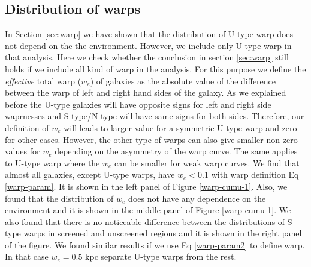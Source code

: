 \documentclass[twocolappendix, numberedappendix]{emulateapj}
\begin{document}
\subsection{Distribution of warps}
\label{ap:warp-distri}
In Section \ref{sec:warp} we have shown that the distribution of
U-type warp does not depend on the the environment. However, we include
only U-type warp in that analysis. Here we check whether the conclusion in
 section \ref{sec:warp} still holds if we include all kind of
warp in the analysis. For this purpose we define the \textit{effective}
total warp ($w_e$) of galaxies as the absolute value of the difference
between the warp of left and right hand sides of the galaxy. As we
explained before the U-type galaxies will have opposite signs for left and 
right side waprnesses and S-type/N-type will have same signs for both sides.
Therefore, our definition of $w_e$ will leads to larger value for a symmetric
U-type warp and zero for other cases. However, the other type of warps can also
give smaller non-zero values for $w_e$ depending on the asymmetry of the warp
curve. The same applies to U-type warp where the $w_e$ can be smaller for weak
warp curves. We find that almost all galaxies, except U-type warps, have
$w_e < 0.1$ with warp definition Eq \ref{warp-param}. It is shown in the
left panel of Figure \ref{warp-cumu-1}. Also, we found that the distribution of
$w_e$ does not have any dependence on the environment and it is shown in the
middle panel of Figure \ref{warp-cumu-1}. We also found that there is no 
noticeable difference between the distributions of S-type warps in screened and
unscreened regions and it is shown in the right panel of the figure. We found
similar results if we use Eq \ref{warp-param2} to define
warp. In that case $w_e = 0.5$ kpc separate U-type warps from the rest. 
\end{document}
